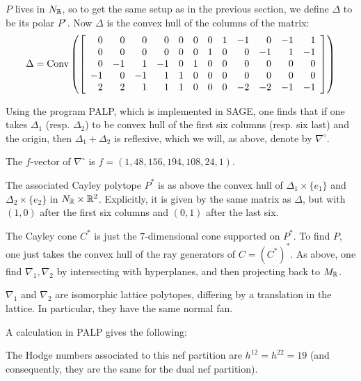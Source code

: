 \documentclass[11pt, english]{article}
\begin{document}

$P$ lives in $N_{\mathbb{R}}$, so to get the same setup as in the previous section, we define $\Delta$ to be its polar $P^\circ$. Now $\Delta$ is the convex hull of the columns of the matrix:
\[
\Delta = \operatorname{Conv} \left(
\left[\begin{array}{rrrrrrrrrrrr}
0  & 0  & 0 & 0 & 0 & 0 &  0 & 1 & -1 & 0  & -1 & 1 \\
0  & 0  & 0 & 0 & 0 & 0 &  1 & 0 & 0  & -1 & 1  & -1 \\
0  & -1 & 1 & -1& 0 & 1 &  0 & 0 & 0  & 0  & 0  & 0 \\
-1 & 0  &-1 & 1 & 1 & 0 &  0 & 0 & 0  & 0  & 0  & 0 \\
2  & 2  & 1 & 1 & 1 & 0 &  0 & 0 & -2 & -2 & -1 & -1
\end{array}\right]\right)
\]

Using the program PALP, which is implemented in SAGE, one finds that if one takes $\Delta_1$ (resp. $\Delta_2$) to be convex hull of the first six columns (resp. six last) and the origin, then $\Delta_1+\Delta_2$ is reflexive, which we will, as above, denote by $\nabla^\circ$.

\begin{lemma}
  The $f$-vector of $\nabla^\circ$ is $f=(1, 48, 156, 194, 108, 24, 1)$. 
\end{lemma}

The associated Cayley polytope $P^\ast$ is as above the convex hull of $\Delta_1 \times \{ e_1\}$ and $\Delta_2 \times \{ e_2\} $ in $N_{\mathbb{R}} \times \mathbb{R}^2$. Explicitly, it is given by the same matrix as $\Delta$, but with $(1,0)$ after the first six columns and $(0,1)$ after the last six.

The Cayley cone $C^\ast$ is just the $7$-dimensional cone supported on $P^\ast$. To find $P$, one just takes the convex hull of the ray generators of $C=(C^\ast)^\ast$. As above, one find $\nabla_1,\nabla_2$ by intersecting with hyperplanes, and then projecting back to $M_{\mathbb{R}}$. 

\begin{lemma}
$\nabla_1$ and $\nabla_2$ are isomorphic lattice polytopes, differing by a translation in the lattice. In particular, they have the same normal fan.   
\end{lemma}

A calculation in PALP gives the following:
\begin{lemma}
The Hodge numbers associated to this nef partition are $h^{12}=h^{22}=19$ (and consequently, they are the same for the dual nef partition).
\end{lemma}
\end{document}
